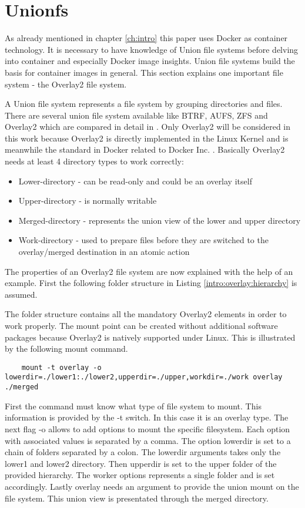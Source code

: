 \section{Unionfs}
\label{sec:intro:docker_image:unionfs}
As already mentioned in chapter \ref{ch:intro} this paper uses Docker as container technology.
It is necessary to have knowledge of Union file systems before delving into container and especially Docker image insights.
Union file systems build the basis for container images in general. This section explains one important file system - the Overlay2 file system.

A Union file system represents a file system by grouping directories and files. There are several union file system available like BTRF, AUFS, ZFS and Overlay2 which are compared in detail in \cite{Tarasov2019}.
Only Overlay2 will be considered in this work because Overlay2 is directly implemented in the Linux Kernel \cite{Tarasov2019} and is meanwhile the standard in Docker related to Docker Inc. \cite{docker_storage_driver}.
Basically Overlay2 needs at least 4 directory types to work correctly:
\begin{itemize}
\item Lower-directory - can be read-only and could be an overlay itself
\item Upper-directory - is normally writable
\item Merged-directory - represents the union view of the lower and upper directory
\item Work-directory - used to prepare files before they are switched to the overlay/merged destination in an atomic action 
\end{itemize}

The properties of an Overlay2 file system are now explained with the help of an example. 
First the following folder structure in Listing \ref{intro:overlay:hierarchy} is assumed.

The folder structure contains all the mandatory Overlay2 elements in order to work properly. The mount point can be created without additional software packages because Overlay2 is natively supported under Linux.
This is illustrated by the following mount command.
\begin{lstlisting}
	mount -t overlay -o lowerdir=./lower1:./lower2,upperdir=./upper,workdir=./work overlay ./merged
\end{lstlisting}

First the command must know what type of file system to mount. This information is provided by the -t switch. In this case it is an overlay type. The next flag -o allows to add options to mount the specific filesystem. Each option with associated values is separated by a comma. The option lowerdir is set to a chain of folders separated by a colon. The lowerdir arguments takes only the lower1 and lower2 directory. Then upperdir is set to the upper folder of the provided hierarchy. The worker options represents a single folder and is set accordingly. Lastly overlay needs an argument to provide the union mount on the file system. This union view is presentated through the merged directory.

